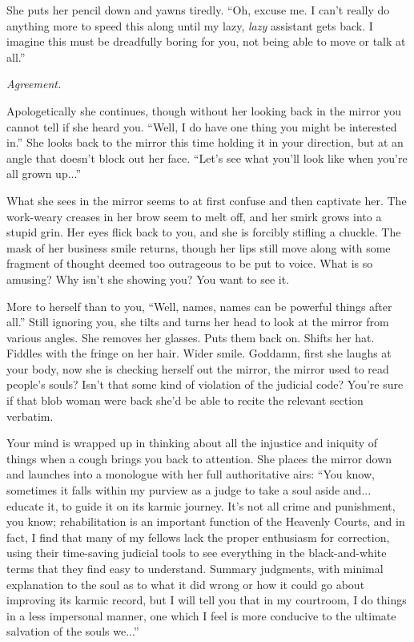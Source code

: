 \documentclass[a4paper,12pt]{book}
\begin{document}
She puts her pencil down and yawns tiredly. ``Oh, excuse me. I can't really do anything more to speed this along until my lazy, \emph{lazy} assistant gets back. I imagine this must be dreadfully boring for you, not being able to move or talk at all.''

\emph{Agreement.}

Apologetically she continues, though without her looking back in the mirror you cannot tell if she heard you. ``Well, I do have one thing you might be interested in.'' She looks back to the mirror this time holding it in your direction, but at an angle that doesn't block out her face. ``Let's see what you'll look like when you're all grown up...''

What she sees in the mirror seems to at first confuse and then captivate her. The work-weary creases in her brow seem to melt off, and her smirk grows into a stupid grin. Her eyes flick back to you, and she is forcibly stifling a chuckle. The mask of her business smile returns, though her lips still move along with some fragment of thought deemed too outrageous to be put to voice. What is so amusing? Why isn't she showing you? You want to see it.

More to herself than to you, ``Well, names, names can be powerful things after all.'' Still ignoring you, she tilts and turns her head to look at the mirror from various angles. She removes her glasses. Puts them back on. Shifts her hat. Fiddles with the fringe on her hair. Wider smile. Goddamn, first she laughs at your body, now she is checking herself out the mirror, the mirror used to read people's souls? Isn't that some kind of violation of the judicial code? You're sure if that blob woman were back she'd be able to recite the relevant section verbatim.

Your mind is wrapped up in thinking about all the injustice and iniquity of things when a cough brings you back to attention. She places the mirror down and launches into a monologue with her full authoritative airs: ``You know, sometimes it falls within my purview as a judge to take a soul aside and... educate it, to guide it on its karmic journey. It's not all crime and punishment, you know; rehabilitation is an important function of the Heavenly Courts, and in fact, I find that many of my fellows lack the proper enthusiasm for correction, using their time-saving judicial tools to see everything in the black-and-white terms that they find easy to understand. Summary judgments, with minimal explanation to the soul as to what it did wrong or how it could go about improving its karmic record, but I will tell you that in my courtroom, I do things in a less impersonal manner, one which I feel is more conducive to the ultimate salvation of the souls we...''
\end{document}
